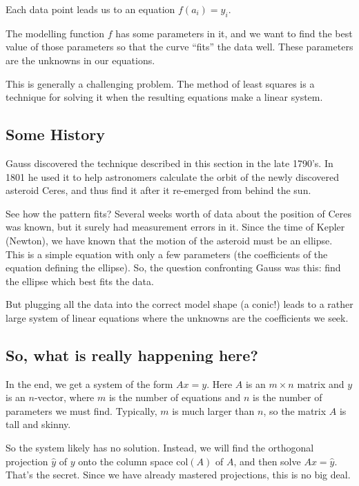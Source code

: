 \documentclass[11pt]{amsart}
\theoremstyle{definition}
\begin{document}
\begin{compactitem}
\item Each data point leads us to an equation $f(a_i) = y_i$.
\item The modelling function $f$ has some parameters in it, and we want to find the best value of those parameters so that the curve ``fits'' the data well. These parameters are the unknowns in our equations.
\end{compactitem}

This is generally a challenging problem. The method of least squares is a technique for solving it when the resulting equations make a linear system.

\subsection{Some History}

Gauss discovered the technique described in this section in the late 1790's. In 1801 he used it to help astronomers calculate the orbit of the newly discovered asteroid Ceres, and thus find it after it re-emerged from behind the sun.

See how the pattern fits? Several weeks worth of data about the position of Ceres was known, but it surely had measurement errors in it. Since the time of Kepler (Newton), we have known that the motion of the asteroid must be an ellipse. This is a simple equation with only a few parameters (the coefficients of the equation defining the ellipse). So, the question confronting Gauss was this: find the ellipse which best fits the data.

But plugging all the data into the correct model shape (a conic!) leads to a rather large system of linear equations where the unknowns are the coefficients we seek.


\subsection{So, what is really happening here?}

In the end, we get a system of the form $Ax = y$. Here $A$ is an $m\times n$ matrix and $y$ is an $n$-vector, where $m$ is the number of equations and $n$ is the number of parameters we must find.
Typically, $m$ is much larger than $n$, so the matrix $A$ is tall and skinny.

So the system likely has no solution. Instead, we will find the orthogonal projection $\hat{y}$ of $y$ onto the column space $\mathrm{col}(A)$ of $A$, and then solve $Ax = \hat{y}$. That's the secret. Since we have already mastered projections, this is no big deal.
\end{document}

